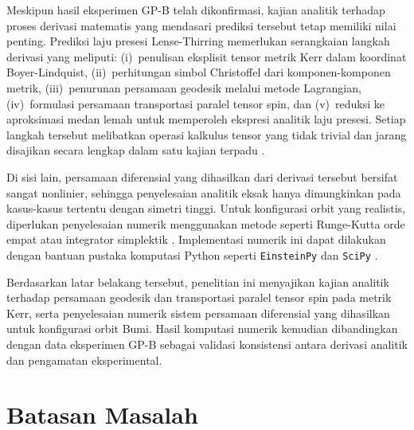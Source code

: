 Meskipun hasil eksperimen GP-B telah dikonfirmasi, kajian analitik terhadap proses derivasi matematis yang mendasari prediksi tersebut tetap memiliki nilai penting. Prediksi laju presesi Lense-Thirring memerlukan serangkaian langkah derivasi yang meliputi: (i)~penulisan eksplisit tensor metrik Kerr dalam koordinat Boyer-Lindquist, (ii)~perhitungan simbol Christoffel dari komponen-komponen metrik, (iii)~penurunan persamaan geodesik melalui metode Lagrangian, (iv)~formulasi persamaan transportasi paralel tensor spin, dan (v)~reduksi ke aproksimasi medan lemah untuk memperoleh ekspresi analitik laju presesi. Setiap langkah tersebut melibatkan operasi kalkulus tensor yang tidak trivial dan jarang disajikan secara lengkap dalam satu kajian terpadu \parencite{Carroll2004SpacetimeGeometry, Schutz2009FirstCourse}.

Di sisi lain, persamaan diferensial yang dihasilkan dari derivasi tersebut bersifat sangat nonlinier, sehingga penyelesaian analitik eksak hanya dimungkinkan pada kasus-kasus tertentu dengan simetri tinggi. Untuk konfigurasi orbit yang realistis, diperlukan penyelesaian numerik menggunakan metode seperti Runge-Kutta orde empat atau integrator simplektik \parencite{Butcher2016NumericalMethods, Hairer2006GeometricIntegration}. Implementasi numerik ini dapat dilakukan dengan bantuan pustaka komputasi Python seperti \texttt{EinsteinPy} dan \texttt{SciPy} \parencite{Bapat2020EinsteinPy, SciPy2020}.

Berdasarkan latar belakang tersebut, penelitian ini menyajikan kajian analitik terhadap persamaan geodesik dan transportasi paralel tensor spin pada metrik Kerr, serta penyelesaian numerik sistem persamaan diferensial yang dihasilkan untuk konfigurasi orbit Bumi. Hasil komputasi numerik kemudian dibandingkan dengan data eksperimen GP-B sebagai validasi konsistensi antara derivasi analitik dan pengamatan eksperimental.

\section{Batasan Masalah}
\label{sec:batasan-masalah}

